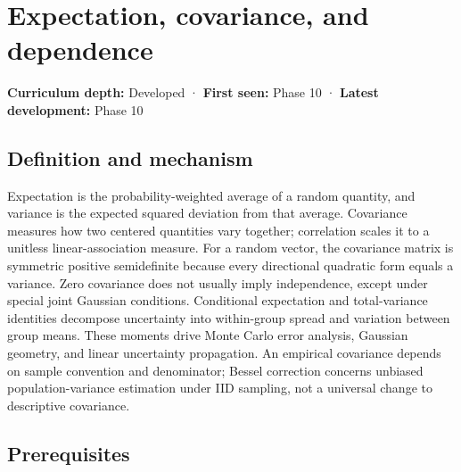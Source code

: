 \hypertarget{appendix-54c383df9992}{}\label{referencestart:appendix-54c383df9992}
\section{Expectation, covariance, and dependence}\label{appendix-54c383df9992-expectation-covariance-and-dependence}

\hypertarget{appendix-54c383df9992-expectation-covariance-and-dependence}{}

\textbf{Curriculum depth:} Developed · \textbf{First seen:} Phase 10 · \textbf{Latest development:} Phase 10

\begin{allmightroledefinition}

\subsection{Definition and mechanism}\label{appendix-54c383df9992-definition-and-mechanism}

\hypertarget{appendix-54c383df9992-definition-and-mechanism}{}

Expectation is the probability-weighted average of a random quantity, and variance is the expected squared deviation from that average. Covariance measures how two centered quantities vary together; correlation scales it to a unitless linear-association measure. For a random vector, the covariance matrix is symmetric positive semidefinite because every directional quadratic form equals a variance. Zero covariance does not usually imply independence, except under special joint Gaussian conditions. Conditional expectation and total-variance identities decompose uncertainty into within-group spread and variation between group means. These moments drive Monte Carlo error analysis, Gaussian geometry, and linear uncertainty propagation. An empirical covariance depends on sample convention and denominator; Bessel correction concerns unbiased population-variance estimation under IID sampling, not a universal change to descriptive covariance.

\end{allmightroledefinition}

\subsection{Prerequisites}\label{appendix-54c383df9992-prerequisites}

\hypertarget{appendix-54c383df9992-prerequisites}{}

